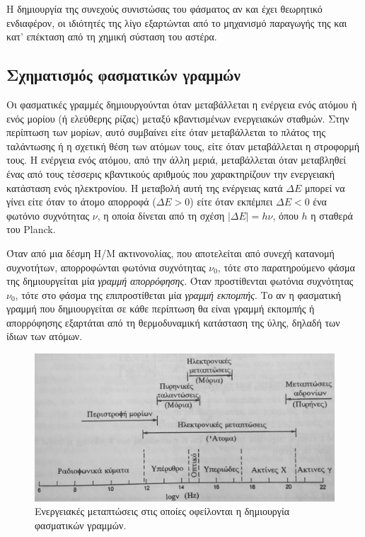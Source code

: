 Η δημιουργία της συνεχούς συνιστώσας του φάσματος αν και έχει θεωρητικό ενδιαφέρον, οι ιδιότητές της λίγο εξαρτώνται από το μηχανισμό παραγωγής της και κατ' επέκταση από τη χημική σύσταση του αστέρα.

\subsection{Σχηματισμός φασματικών γραμμών}
Οι φασματικές γραμμές δημιουργούνται όταν μεταβάλλεται η ενέργεια ενός ατόμου ή ενός μορίου (ή ελεύθερης ρίζας) μεταξύ κβαντισμένων ενεργειακών σταθμών. Στην περίπτωση των μορίων, αυτό συμβαίνει είτε όταν μεταβάλλεται το πλάτος της ταλάντωσης ή η σχετική θέση των ατόμων τους, είτε όταν μεταβάλλεται η στροφορμή τους. Η ενέργεια ενός ατόμου, από την άλλη μεριά, μεταβάλλεται όταν μεταβληθεί ένας από τους τέσσερις κβαντικούς αριθμούς που χαρακτηρίζουν την ενεργειακή κατάσταση ενός ηλεκτρονίου. Η μεταβολή αυτή της ενέργειας κατά $\Delta E$ μπορεί να γίνει είτε όταν το άτομο απορροφά ($\Delta E > 0$) είτε όταν εκπέμπει $\Delta E < 0$ ένα φωτόνιο συχνότητας $\nu$, η οποία δίνεται από τη σχέση $|\Delta E| = h\nu$, όπου $h$ η σταθερά του Planck.

Όταν από μια δέσμη Η/Μ ακτινονολίας, που αποτελείται από συνεχή κατανομή συχνοτήτων, απορροφώνται φωτόνια συχνότητας $\nu_0$, τότε στο παρατηρούμενο φάσμα της δημιουργείται μία \textit{γραμμή απορρόφησης}. Όταν προστίθενται φωτόνια συχνότητας $\nu_0$, τότε στο φάσμα της επιπροστίθεται μία \textit{γραμμή εκπομπής}. Το αν η φασματική γραμμή που δημιουργείται σε κάθε περίπτωση θα είναι γραμμή εκπομπής ή απορρόφησης εξαρτάται από τη θερμοδυναμική κατάσταση της ύλης, δηλαδή των ίδιων των ατόμων.

\begin{figure}[h]
    \centering
    \includegraphics[width=\linewidth]{Figures/energy_transitions.jpeg}
    \caption{Ενεργειακές μεταπτώσεις στις οποίες οφείλονται η δημιουργία φασματικών γραμμών.}
    \label{fig:energy_transitions}
\end{figure}

